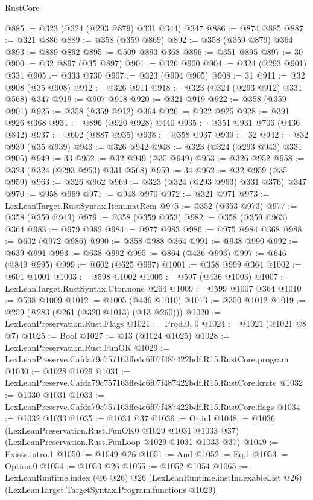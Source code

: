 \begin{lexlean}{RustCore}
\begin{coremodule}
@885 := @323 (@324 (@293 @879) @331 @344) @347
@886 := @874 @885
@887 := @321 @886
@889 := @358 (@359 @869)
@892 := @358 (@359 @879) @364
@893 := @889 @892
@895 := @509 @893 @368
@896 := @351 @895
@897 := 30
@900 := @32 @897 (@35 @897)
@901 := @326 @900
@904 := @324 (@293 @901) @331
@905 := @333 @730
@907 := @323 (@904 @905)
@908 := 31
@911 := @32 @908 (@35 @908)
@912 := @326 @911
@918 := @323 (@324 (@293 @912) @331 @568) @347
@919 := @907 @918
@920 := @321 @919
@922 := @358 (@359 @901)
@925 := @358 (@359 @912) @364
@926 := @922 @925
@928 := @391 @926 @368
@931 := @896 (@920 @928) @440
@935 := @351 @931 @706 (@436 @842)
@937 := @602 (@887 @935)
@938 := @358 @937
@939 := 32
@942 := @32 @939 (@35 @939)
@943 := @326 @942
@948 := @323 (@324 (@293 @943) @331 @905)
@949 := 33
@952 := @32 @949 (@35 @949)
@953 := @326 @952
@958 := @323 (@324 (@293 @953) @331 @568)
@959 := 34
@962 := @32 @959 (@35 @959)
@963 := @326 @962
@969 := @323 (@324 (@293 @963) @331 @376) @347
@970 := @958 @969
@971 := @948 @970
@972 := @321 @971
@973 := LexLeanTarget.RustSyntax.Item.natRem
@975 := @352 (@353 @973)
@977 := @358 (@359 @943)
@979 := @358 (@359 @953)
@982 := @358 (@359 @963) @364
@983 := @979 @982
@984 := @977 @983
@986 := @975 @984 @368
@988 := @602 (@972 @986)
@990 := @358 @988 @364
@991 := @938 @990
@992 := @639 @991
@993 := @638 @992
@995 := @864 (@436 @993)
@997 := @646 (@849 @995)
@999 := @602 (@625 @997)
@1001 := @358 @999 @364
@1002 := @601 @1001
@1003 := @598 @1002
@1005 := @597 (@436 @1003)
@1007 := LexLeanTarget.RustSyntax.Ctor.none @264
@1009 := @599 @1007 @364
@1010 := @598 @1009
@1012 := @1005 (@436 @1010)
@1013 := @350 @1012
@1019 := @259 (@283 (@261 (@320 @1013) (@13 @260)))
@1020 := LexLeanPreservation.Rust.Flags
@1021 := Prod.{0, 0}
@1024 := @1021 (@1021 @8 @7)
@1025 := Bool
@1027 := @13 (@1024 @1025)
@1028 := LexLeanPreservation.Rust.FunOK
@1029 := LexLeanPreserve.Cafda79c757163ffe4c6f07f487422bdf.R15.RustCore.program
@1030 := @1028 @1029
@1031 := LexLeanPreserve.Cafda79c757163ffe4c6f07f487422bdf.R15.RustCore.krate
@1032 := @1030 @1031
@1033 := LexLeanPreserve.Cafda79c757163ffe4c6f07f487422bdf.R15.RustCore.flags
@1034 := @1032 @1033
@1035 := @1034 @37
@1036 := Or.inl
@1048 := @1036
    (LexLeanPreservation.Rust.FunOK0 @1029 @1031 @1033 @37)
    (LexLeanPreservation.Rust.FunLoop @1029 @1031 @1033 @37)
@1049 := Exists.intro.{1}
@1050 := @1049 @26
@1051 := And
@1052 := Eq.{1}
@1053 := Option.{0}
@1054 := @1053 @26
@1055 := @1052 @1054
@1065 := LexLeanRuntime.index
    (@6 @26)
    @26
    (LexLeanRuntime.instIndexableList @26)
    (LexLeanTarget.TargetSyntax.Program.functions @1029)

\end{coremodule}
\end{lexlean}
